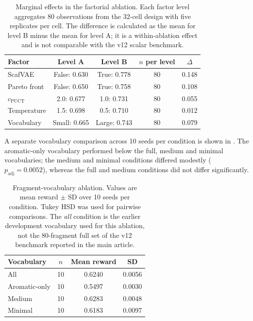 \documentclass[10pt,a4paper]{article}
\begin{document}
\begin{table}[htbp]
  \centering
  \caption{Marginal effects in the factorial ablation. Each factor level
  aggregates \num{80} observations from the \num{32}-cell design with five
  replicates per cell. The difference is calculated as the mean for level B
  minus the mean for level A; it is a within-ablation effect and is not
  comparable with the v12 scalar benchmark.}
  \label{tab:sm_component_ablation}
  \small
  \begin{tabular}{lcccc}
    \toprule
    Factor & Level A & Level B & $n$ per level & $\Delta$ \\
    \midrule
    ScafVAE & False: \num{0.630} & True: \num{0.778} & \num{80} & \num{0.148} \\
    Pareto front & False: \num{0.650} & True: \num{0.758} & \num{80} & \num{0.108} \\
    $c_{\mathrm{PUCT}}$ & \num{2.0}: \num{0.677} & \num{1.0}: \num{0.731} & \num{80} & \num{0.055} \\
    Temperature & \num{1.5}: \num{0.698} & \num{0.5}: \num{0.710} & \num{80} & \num{0.012} \\
    Vocabulary & Small: \num{0.665} & Large: \num{0.743} & \num{80} & \num{0.079} \\
    \bottomrule
  \end{tabular}
\end{table}

A separate vocabulary comparison across \num{10} seeds per condition is shown in . The aromatic-only vocabulary performed below the full, medium and minimal vocabularies; the medium and minimal conditions differed modestly ($p_{\mathrm{adj}}=\num{0.0052}$), whereas the full and medium conditions did not differ significantly.

\begin{table}[htbp]
  \centering
  \caption{Fragment-vocabulary ablation. Values are mean reward $\pm$ SD over
  \num{10} seeds per condition. Tukey HSD was used for pairwise comparisons. The
  \emph{all} condition is the earlier development vocabulary used for this ablation,
  not the \num{80}-fragment full set of the v12 benchmark reported in the main article.}
  \label{tab:sm_vocabulary_ablation}
  \small
  \begin{tabular}{lccc}
    \toprule
    Vocabulary & $n$ & Mean reward & SD \\
    \midrule
    All & \num{10} & \num{0.6240} & \num{0.0056} \\
    Aromatic-only & \num{10} & \num{0.5497} & \num{0.0030} \\
    Medium & \num{10} & \num{0.6283} & \num{0.0048} \\
    Minimal & \num{10} & \num{0.6183} & \num{0.0097} \\
    \bottomrule
  \end{tabular}
\end{table}
\end{document}
